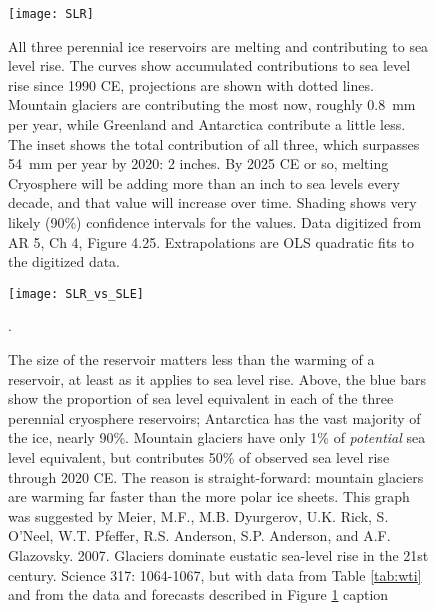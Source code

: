\documentclass[amstex,12pt]{book}
\begin{document}
\begin{figure}[p]
	\centering
  \texttt{[image: SLR]}%
	\caption{All three perennial ice reservoirs are melting and contributing to sea level rise. The curves show accumulated contributions to sea level rise since 1990 CE, projections are shown with dotted lines. Mountain glaciers are contributing the most now, roughly \SI{0.8}{\milli\metre} per year, while Greenland and Antarctica contribute a little less. The inset shows the total contribution of all three, which surpasses \SI{54}{\milli\metre} per year by 2020: 2 inches. By 2025 CE or so, melting Cryosphere will be adding more than an inch to sea levels every decade, and that value will increase over time. Shading shows very likely (90\%) confidence intervals for the values. Data digitized from AR 5, Ch 4, Figure 4.25. Extrapolations are OLS quadratic fits to the digitized data.}  
	\label{fig:SLR}
\end{figure}

\begin{figure}[p]
	\centering
  \texttt{[image: SLR\_vs\_SLE]}%
	\caption{The size of the reservoir matters less than the warming of a reservoir, at least as it applies to sea level rise. Above, the blue bars show the proportion of sea level equivalent in each of the three perennial cryosphere reservoirs; Antarctica has the vast majority of the ice, nearly 90\%. Mountain glaciers have only 1\% of \emph{potential} sea level equivalent, but contributes 50\% of observed sea level rise through 2020 CE. The reason is straight-forward: mountain glaciers are warming far faster than the more polar ice sheets. This graph was suggested by Meier, M.F., M.B. Dyurgerov, U.K. Rick, S. O'Neel, W.T. Pfeffer, R.S. Anderson, S.P. Anderson, and A.F. Glazovsky. 2007. Glaciers dominate eustatic sea-level rise in the 21st century. Science 317: 1064-1067, but with data from Table \ref{tab:wti} and from the data and forecasts described in Figure \ref{fig:SLR} caption}.   
	\label{fig:SLR_vs_SLE}
\end{figure}
\end{document}
